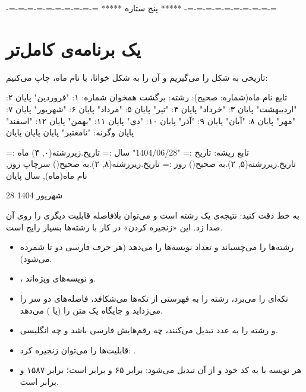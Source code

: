 \begin{outputfa}
-=-=-=-=-=-=-=-=-=-=
***** پنج ستاره *****
-=-=-=-=-=-=-=-=-=-=
\end{outputfa}

\section{یک برنامه‌ی کامل‌تر}

تاریخی به شکل  را می‌گیریم و آن را به شکل خوانا، با
نام ماه، چاپ می‌کنیم:

\begin{salamfa}
تابع نام ماه(شماره: صحیح): رشته:
    برگشت همخوان شماره:
        ۱: "فروردین" پایان
        ۲: "اردیبهشت" پایان
        ۳: "خرداد" پایان
        ۴: "تیر" پایان
        ۵: "مرداد" پایان
        ۶: "شهریور" پایان
        ۷: "مهر" پایان
        ۸: "آبان" پایان
        ۹: "آذر" پایان
        ۱۰: "دی" پایان
        ۱۱: "بهمن" پایان
        ۱۲: "اسفند" پایان
        وگرنه: "نامعتبر" پایان
    پایان
پایان

تابع ریشه:
    تاریخ := "1404/06/28"
    سال := تاریخ.زیررشته(۰, ۴)
    ماه := تاریخ.زیررشته(۵, ۲).به صحیح()
    روز := تاریخ.زیررشته(۸, ۲).به صحیح()
    سرچاپ روز, نام ماه(ماه), سال
پایان
\end{salamfa}

\begin{outputfa}
28 شهریور 1404
\end{outputfa}

به خط  دقت کنید: نتیجه‌ی
 یک رشته است و می‌توان بلافاصله قابلیت دیگری را روی آن
صدا زد. این «زنجیره کردن» در کار با رشته‌ها بسیار رایج است.

\begin{summary}
\begin{itemize}
  \item \code{+} رشته‌ها را می‌چسباند و  تعداد نویسه‌ها را
        می‌دهد (هر حرف فارسی دو تا شمرده می‌شود).
  \item {}،  و
         نویسه‌های ویژه‌اند.
  \item {} تکه‌ای را می‌برد،
         رشته را به فهرستی از تکه‌ها می‌شکافد،
         فاصله‌های دو سر را می‌زداید و 
        جایگاه یک متن را (یا ) می‌دهد.
  \item {} و  رشته را به عدد تبدیل
        می‌کنند، چه رقم‌هایش فارسی باشد و چه انگلیسی.
  \item قابلیت‌ها را می‌توان زنجیره کرد: .
  \item هر نویسه با  به کد خود و از آن تبدیل می‌شود:
         برابر ۶۵ و  برابر
         است؛  برابر ۱۵۸۷ و
         برابر  است.
\end{itemize}
\end{summary}

